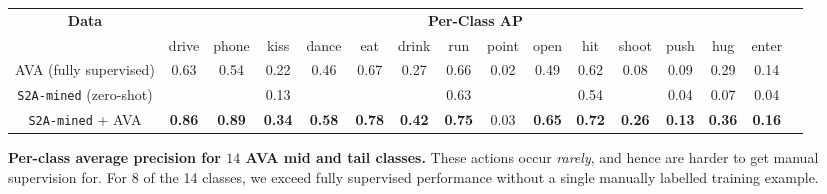 
\centering 
\footnotesize{
\begin{tabular}{c c c c c c c c c c c c c c c c} 
\toprule
\multicolumn{1}{c}{\textbf{Data}}&
\multicolumn{14}{c}{\textbf{Per-Class AP}}  \\
                              & drive & phone & kiss & dance & eat & drink & run & point & open & hit & shoot & push & hug & enter \\ 
\midrule
AVA \tiny{(fully supervised)} & 0.63  & 0.54  & 0.22 & 0.46  &0.67 & 0.27  & 0.66 & 0.02 & 0.49 & 0.62 & 0.08 & 0.09 & 0.29 &0.14 \\
\midrule
 \texttt{S2A-mined} \tiny{(zero-shot)} & \cellcolor{mistyrose}{0.83} & \cellcolor{mistyrose}{0.79} & 0.13 & \cellcolor{mistyrose}{0.55} & \cellcolor{mistyrose}{0.68} & \cellcolor{mistyrose}{0.30} & 0.63 &  \cellcolor{mistyrose}{0.04}& \cellcolor{mistyrose}{0.52} & 0.54 & \cellcolor{mistyrose}{0.18} & 0.04 & 0.07 & 0.04\\
\midrule
\texttt{S2A-mined} + AVA & \textbf{0.86} & \textbf{0.89} & \textbf{0.34} & \textbf{0.58} & \textbf{0.78} & \textbf{0.42} & \textbf{0.75} & 0.03 & \textbf{0.65} & \textbf{0.72} & \textbf{0.26} & \textbf{0.13} & \textbf{0.36} & \textbf{0.16}\\
 \bottomrule
\end{tabular}
}
\caption{{\textbf{Per-class average precision for $14$ AVA mid and tail classes.} These actions occur \textit{rarely}, and hence are harder to get manual supervision for. For 8 of the 14 classes, we exceed fully supervised performance without a single manually labelled training example. }}





